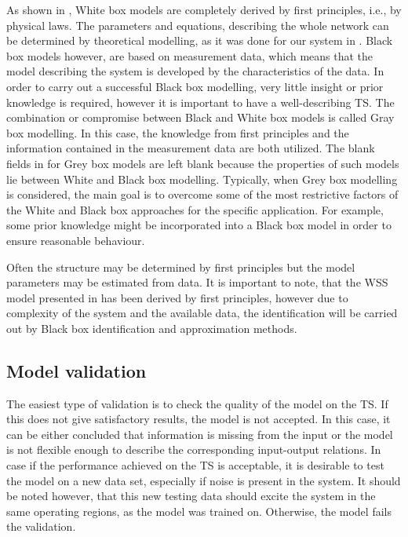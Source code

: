 As shown in , White box models are completely derived by first principles, i.e., by physical laws. The parameters and equations, describing the whole network can be determined by theoretical modelling, as it was done for our system in . Black box models however, are based on measurement data, which means that the model describing the system is developed by the characteristics of the data. In order to carry out a successful Black box modelling, very little insight or prior knowledge is required, however it is important to have a well-describing TS. The combination or compromise between Black and White box models is called Gray box modelling. In this case, the knowledge from first principles and the information contained in the measurement data are both utilized. The blank fields in  for Grey box models are left blank because the properties of such models lie between White and Black box modelling. Typically, when Grey box modelling is considered, the main goal is to overcome some of the most restrictive factors of the White and Black box approaches for the specific application. For example, some prior knowledge might be incorporated into a Black box model in order to ensure reasonable behaviour\cite{nelles2013nonlinear}. 

Often the structure may be determined by first principles but the model parameters may be estimated from data. It is important to note, that the WSS model presented in  has been derived by first principles, however due to complexity of the system and the available data, the identification will be carried out by Black box identification and approximation methods. 

\subsection{Model validation}
\label{model_validation}

The easiest type of validation is to check the quality of the model on the TS. If this does not give satisfactory results, the model is not accepted. In this case, it can be either concluded that information is missing from the input or the model is not flexible enough to describe the corresponding input-output relations. In case if the performance achieved on the TS is acceptable, it is desirable to test the model on a new data set, especially if noise is present in the system. It should be noted however, that this new testing data should excite the system in the same operating regions, as the model was trained on. Otherwise, the model fails the validation. 
